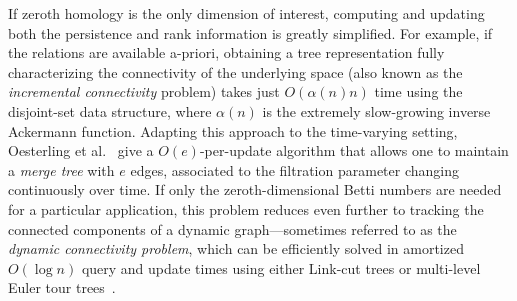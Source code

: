 \documentclass[sn-mathphys]{sn-jnl}
\begin{document}
If  zeroth homology is the only dimension of interest, computing and updating both the persistence and rank information  is greatly simplified. For example, if the relations are available a-priori, obtaining a tree representation fully characterizing the connectivity of the underlying space (also known as the \emph{incremental connectivity} problem) takes just $O(\alpha(n) n)$ time using the disjoint-set data structure, where $\alpha(n)$ is the extremely slow-growing inverse Ackermann function. 
Adapting this approach to the time-varying setting, Oesterling et al.~\cite{oesterling2015computing} give a $O(e)$-per-update algorithm that allows one to maintain a \emph{merge tree} with $e$ edges,
associated to the filtration parameter changing continuously over time. 
If only the zeroth-dimensional Betti numbers are needed for a particular application, this problem reduces even further to tracking the connected components of a dynamic graph---sometimes referred to as the \emph{dynamic connectivity problem}, which can be efficiently  solved in amortized $O(\log n)$ query and update times using either Link-cut trees or multi-level Euler tour trees~\cite{kapron2013dynamic}.
  
\end{document}
